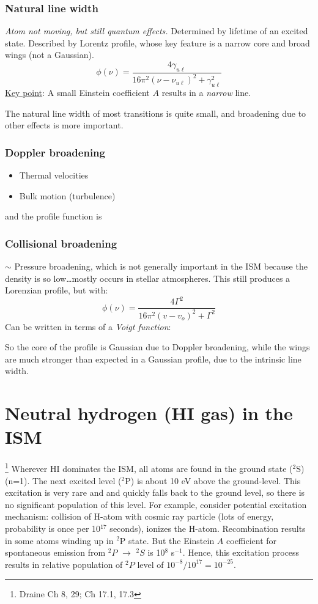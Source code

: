 \documentclass[12pt]{article}
\newcommand{\mar}[1]{\hspace{0pt}\marginpar{-\textcolor{black}{#1}-}}
\newcommand{\mynotes}[1]{{\fontfamily{cmss}\selectfont \textit{#1}}}
\let\oldsection\section
\renewcommand\section{\clearpage\oldsection}
\begin{document}
\subsubsection{Natural line width}
\mynotes{Atom not moving, but still quantum effects.}
Determined by lifetime of an excited state. Described by Lorentz profile,
whose key feature is a narrow core and broad wings (not a Gaussian).
\[
    \phi(\nu)
    = \frac{4\gamma_{u\ell}}{16\pi^{2} (\nu - \nu_{u\ell})^{2} +
    \gamma_{u\ell}^{2} }
    \]
\underline{Key point}: A small Einstein coefficient $A$ results
in a \emph{narrow} line.

The natural line width of most transitions is quite small, and broadening
due to other effects is more important.
\subsubsection{Doppler broadening}
\begin{itemize}
    \item Thermal velocities
    \item Bulk motion (turbulence)
\end{itemize}

and\mar{32} the profile function is

\subsubsection{Collisional broadening}
$\sim$ Pressure broadening, which is not generally important in the ISM because
the density is so low\ldots mostly occurs in stellar atmospheres.
This still produces a Lorenzian profile, but with:
\[
    \phi(\nu) = \frac{4\Gamma^{2}}{16\pi^{2}(v-v_{o})^{2} + \Gamma^{2}}
    \]
Can be written in terms of a \emph{Voigt function}:

\mar{33}So the core of the profile is Gaussian due to Doppler broadening,
while the wings are much stronger than expected in a Gaussian profile,
due to the intrinsic line width.

\newpage
\section{Neutral hydrogen (HI gas) in the ISM}
\footnote{Draine Ch 8, 29; Ch 17.1, 17.3}
Wherever HI dominates the ISM, all atoms are found in the ground state
($^{2}$S)(n=1). The next excited level ($^{2}$P) is about 10 eV above the
ground-level. This excitation is very rare and and quickly falls back to the
ground level, so there is no significant population of this level. For example,
consider potential excitation mechanism: collision of H-atom with cosmic ray
particle (lots of energy, probability is once per 10$^{17}$ seconds), ionizes
the H-atom. Recombination results in some atoms winding up in $^{2}$P state.
But the Einstein $A$ coefficient for spontaneous emission from $^{2}P$
$\rightarrow$ $^{2}S$ is 10$^{8}$ s$^{-1}$. Hence, this excitation process
results in relative population of $^{2}P$ level of $10^{-8}/10^{17} =
10^{-25}$.
\end{document}
